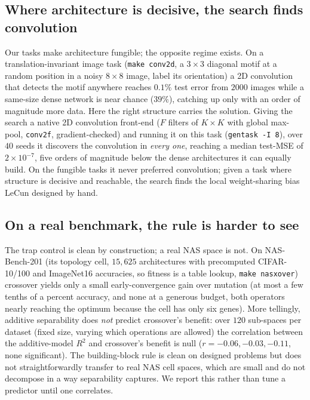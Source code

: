 \documentclass[11pt]{article}
\begin{document}
\subsection{Where architecture is decisive, the search finds convolution}

Our tasks make architecture fungible; the opposite regime exists. On a
translation-invariant image task (\texttt{make conv2d}, a $3\times3$ diagonal motif at a
random position in a noisy $8\times8$ image, label its orientation) a 2D convolution
that detects the motif anywhere reaches $0.1\%$ test error from $2000$ images while a
same-size dense network is near chance ($39\%$), catching up only with an order of
magnitude more data. Here the right structure carries the solution. Giving the search a
native 2D convolution front-end ($F$ filters of $K\times K$ with global max-pool,
\texttt{conv2f}, gradient-checked) and running it on this task
(\texttt{gentask -I 8}), over $40$ seeds it discovers the convolution in \emph{every
one}, reaching a median test-MSE of $2\times10^{-7}$, five orders of magnitude below the
dense architectures it can equally build. On the fungible tasks it never preferred
convolution; given a task where structure is decisive and reachable, the search finds
the local weight-sharing bias LeCun designed by hand.

\subsection{On a real benchmark, the rule is harder to see}

The trap control is clean by construction; a real NAS space is not. On NAS-Bench-201
\cite{li2019} (its topology cell, $15{,}625$ architectures with precomputed
CIFAR-10/100 and ImageNet16 accuracies, so fitness is a table lookup, \texttt{make
nasxover}) crossover yields only a small early-convergence gain over mutation (at most a
few tenths of a percent accuracy, and none at a generous budget, both operators nearly
reaching the optimum because the cell has only six genes). More tellingly, additive
separability does \emph{not} predict crossover's benefit: over $120$ sub-spaces per
dataset (fixed size, varying which operations are allowed) the correlation between the
additive-model $R^2$ and crossover's benefit is null ($r = -0.06, -0.03, -0.11$, none
significant). The building-block rule is clean on designed problems but does not
straightforwardly transfer to real NAS cell spaces, which are small and do not decompose
in a way separability captures. We report this rather than tune a predictor until one
correlates.
\end{document}
